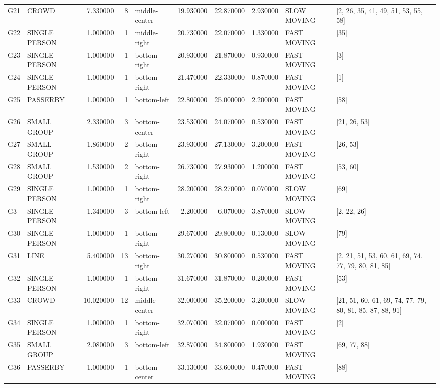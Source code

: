 \begin{table}
\begin{tabular}{llrrlrrrll}
G21 & CROWD & 7.330000 & 8 & middle-center & 19.930000 & 22.870000 & 2.930000 & SLOW MOVING & [2, 26, 35, 41, 49, 51, 53, 55, 58] \\
G22 & SINGLE PERSON & 1.000000 & 1 & middle-right & 20.730000 & 22.070000 & 1.330000 & FAST MOVING & [35] \\
G23 & SINGLE PERSON & 1.000000 & 1 & bottom-right & 20.930000 & 21.870000 & 0.930000 & FAST MOVING & [3] \\
G24 & SINGLE PERSON & 1.000000 & 1 & bottom-right & 21.470000 & 22.330000 & 0.870000 & FAST MOVING & [1] \\
G25 & PASSERBY & 1.000000 & 1 & bottom-left & 22.800000 & 25.000000 & 2.200000 & FAST MOVING & [58] \\
G26 & SMALL GROUP & 2.330000 & 3 & bottom-center & 23.530000 & 24.070000 & 0.530000 & FAST MOVING & [21, 26, 53] \\
G27 & SMALL GROUP & 1.860000 & 2 & bottom-right & 23.930000 & 27.130000 & 3.200000 & FAST MOVING & [26, 53] \\
G28 & SMALL GROUP & 1.530000 & 2 & bottom-right & 26.730000 & 27.930000 & 1.200000 & FAST MOVING & [53, 60] \\
G29 & SINGLE PERSON & 1.000000 & 1 & bottom-right & 28.200000 & 28.270000 & 0.070000 & SLOW MOVING & [69] \\
G3 & SINGLE PERSON & 1.340000 & 3 & bottom-left & 2.200000 & 6.070000 & 3.870000 & SLOW MOVING & [2, 22, 26] \\
G30 & SINGLE PERSON & 1.000000 & 1 & bottom-right & 29.670000 & 29.800000 & 0.130000 & SLOW MOVING & [79] \\
G31 & LINE & 5.400000 & 13 & bottom-right & 30.270000 & 30.800000 & 0.530000 & FAST MOVING & [2, 21, 51, 53, 60, 61, 69, 74, 77, 79, 80, 81, 85] \\
G32 & SINGLE PERSON & 1.000000 & 1 & bottom-right & 31.670000 & 31.870000 & 0.200000 & FAST MOVING & [53] \\
G33 & CROWD & 10.020000 & 12 & middle-center & 32.000000 & 35.200000 & 3.200000 & SLOW MOVING & [21, 51, 60, 61, 69, 74, 77, 79, 80, 81, 85, 87, 88, 91] \\
G34 & SINGLE PERSON & 1.000000 & 1 & bottom-right & 32.070000 & 32.070000 & 0.000000 & FAST MOVING & [2] \\
G35 & SMALL GROUP & 2.080000 & 3 & bottom-left & 32.870000 & 34.800000 & 1.930000 & FAST MOVING & [69, 77, 88] \\
G36 & PASSERBY & 1.000000 & 1 & bottom-center & 33.130000 & 33.600000 & 0.470000 & FAST MOVING & [88] \\

\end{tabular}
\end{table}
